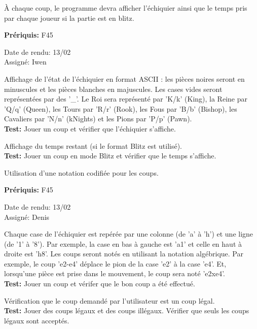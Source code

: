 \documentclass{article}
\begin{document}
\begin{needbox}
    À chaque coup, le programme devra afficher l'échiquier ainsi que le temps pris par chaque joueur si la partie est en blitz.

    \textbf{Prériquis:} F45
    \begin{duedatebox}
        Date de rendu: 13/02\\
        Assigné: Iwen
    \end{duedatebox}
    \begin{subneedbox}[F26.1: Echiquier]
        Affichage de l'état de l'échiquier en format ASCII : les pièces noires seront en minuscules et les pièces blanches en majuscules. Les cases vides seront représentées par des '\_'. Le Roi sera représenté par 'K/k' (King), la Reine par 'Q/q' (Queen), les Tours par 'R/r' (Rook), les Fous par 'B/b' (Bishop), les Cavaliers par 'N/n' (kNights) et les Pions par 'P/p' (Pawn).\\
        \textbf{Test:} Jouer un coup et vérifier que l'échiquier s'affiche.
    \end{subneedbox}
    \begin{subneedbox}
        Affichage du temps restant (si le format Blitz est utilisé).\\
        \textbf{Test:} Jouer un coup en mode Blitz et vérifier que le temps s'affiche.
    \end{subneedbox}
\end{needbox}

\begin{needbox}
    Utilisation d'une notation codifiée pour les coups.

    \textbf{Prériquis:} F45
    \begin{duedatebox}
        Date de rendu: 13/02\\
        Assigné: Denis
    \end{duedatebox}
    \begin{subneedbox}
        Chaque case de l'échiquier est repérée par une colonne (de 'a' à 'h') et une ligne (de '1' à '8'). Par exemple, la case en bas à gauche est 'a1' et celle en haut à droite est 'h8'. Les coups seront notés en utilisant la notation algébrique. Par exemple, le coup 'e2-e4' déplace le pion de la case 'e2' à la case 'e4'. Et, lorsqu'une pièce est prise dans le mouvement, le coup sera noté 'e2xe4'.\\
        \textbf{Test:} Jouer un coup et vérifer que le bon coup a été effectué.
    \end{subneedbox}
    \begin{subneedbox}
        Vérification que le coup demandé par l'utilisateur est un coup légal.\\
        \textbf{Test:} Jouer des coups légaux et des coups illégaux. Vérifier que seuls les coups légaux sont acceptés.
    \end{subneedbox}
\end{needbox}
\end{document}
